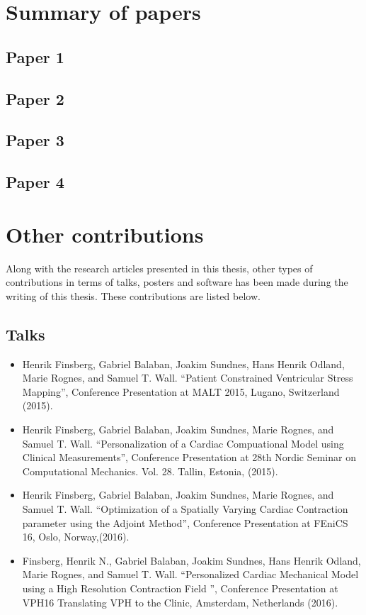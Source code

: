 
\section{Summary of papers}


\subsection{Paper 1}

\subsection{Paper 2}

\subsection{Paper 3}

\subsection{Paper 4}


\section{Other contributions}
Along with the research articles presented in this thesis, other
types of contributions in terms of talks, posters and software has
been made during the writing of this thesis. These contributions are
listed below.

\subsection{Talks}
\begin{itemize}
  \item Henrik Finsberg, Gabriel Balaban, Joakim Sundnes, Hans
    Henrik Odland, Marie Rognes, and Samuel T. Wall. ``Patient
    Constrained Ventricular Stress Mapping'',
    Conference Presentation at MALT 2015,  Lugano, Switzerland (2015).
  \item Henrik Finsberg, Gabriel Balaban, Joakim Sundnes, Marie
    Rognes, and Samuel T. Wall. ``Personalization of a Cardiac
    Compuational Model using Clinical Measurements'', Conference
    Presentation at 28th Nordic Seminar on Computational
    Mechanics. Vol. 28. Tallin, Estonia, (2015).
  \item Henrik Finsberg, Gabriel Balaban, Joakim Sundnes, Marie
    Rognes, and Samuel T. Wall. ``Optimization of a Spatially Varying
    Cardiac Contraction parameter using the Adjoint Method'',
    Conference Presentation at FEniCS 16, Oslo, Norway,(2016).
  \item Finsberg, Henrik N., Gabriel Balaban, Joakim Sundnes, Hans
    Henrik Odland, Marie Rognes, and Samuel T. Wall. ``Personalized
    Cardiac Mechanical Model using a High Resolution Contraction Field
    '',  Conference Presentation at VPH16 Translating VPH to the
    Clinic,  Amsterdam, Netherlands (2016).
\end{itemize}


